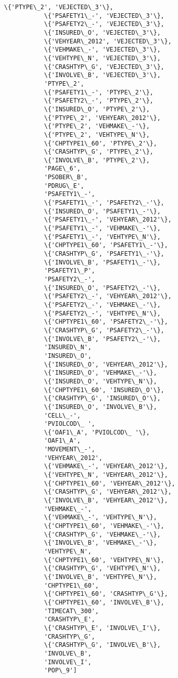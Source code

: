 \documentclass[11pt]{article}
\begin{document}
\begin{Verbatim}[commandchars=\\\{\}]
           \{'PTYPE\_2', 'VEJECTED\_3'\},
           \{'PSAFETY1\_-', 'VEJECTED\_3'\},
           \{'PSAFETY2\_-', 'VEJECTED\_3'\},
           \{'INSURED\_O', 'VEJECTED\_3'\},
           \{'VEHYEAR\_2012', 'VEJECTED\_3'\},
           \{'VEHMAKE\_-', 'VEJECTED\_3'\},
           \{'VEHTYPE\_N', 'VEJECTED\_3'\},
           \{'CRASHTYP\_G', 'VEJECTED\_3'\},
           \{'INVOLVE\_B', 'VEJECTED\_3'\},
           'PTYPE\_2',
           \{'PSAFETY1\_-', 'PTYPE\_2'\},
           \{'PSAFETY2\_-', 'PTYPE\_2'\},
           \{'INSURED\_O', 'PTYPE\_2'\},
           \{'PTYPE\_2', 'VEHYEAR\_2012'\},
           \{'PTYPE\_2', 'VEHMAKE\_-'\},
           \{'PTYPE\_2', 'VEHTYPE\_N'\},
           \{'CHPTYPE1\_60', 'PTYPE\_2'\},
           \{'CRASHTYP\_G', 'PTYPE\_2'\},
           \{'INVOLVE\_B', 'PTYPE\_2'\},
           'PAGE\_6',
           'PSOBER\_B',
           'PDRUG\_E',
           'PSAFETY1\_-',
           \{'PSAFETY1\_-', 'PSAFETY2\_-'\},
           \{'INSURED\_O', 'PSAFETY1\_-'\},
           \{'PSAFETY1\_-', 'VEHYEAR\_2012'\},
           \{'PSAFETY1\_-', 'VEHMAKE\_-'\},
           \{'PSAFETY1\_-', 'VEHTYPE\_N'\},
           \{'CHPTYPE1\_60', 'PSAFETY1\_-'\},
           \{'CRASHTYP\_G', 'PSAFETY1\_-'\},
           \{'INVOLVE\_B', 'PSAFETY1\_-'\},
           'PSAFETY1\_P',
           'PSAFETY2\_-',
           \{'INSURED\_O', 'PSAFETY2\_-'\},
           \{'PSAFETY2\_-', 'VEHYEAR\_2012'\},
           \{'PSAFETY2\_-', 'VEHMAKE\_-'\},
           \{'PSAFETY2\_-', 'VEHTYPE\_N'\},
           \{'CHPTYPE1\_60', 'PSAFETY2\_-'\},
           \{'CRASHTYP\_G', 'PSAFETY2\_-'\},
           \{'INVOLVE\_B', 'PSAFETY2\_-'\},
           'INSURED\_N',
           'INSURED\_O',
           \{'INSURED\_O', 'VEHYEAR\_2012'\},
           \{'INSURED\_O', 'VEHMAKE\_-'\},
           \{'INSURED\_O', 'VEHTYPE\_N'\},
           \{'CHPTYPE1\_60', 'INSURED\_O'\},
           \{'CRASHTYP\_G', 'INSURED\_O'\},
           \{'INSURED\_O', 'INVOLVE\_B'\},
           'CELL\_-',
           'PVIOLCOD\_ ',
           \{'OAF1\_A', 'PVIOLCOD\_ '\},
           'OAF1\_A',
           'MOVEMENT\_-',
           'VEHYEAR\_2012',
           \{'VEHMAKE\_-', 'VEHYEAR\_2012'\},
           \{'VEHTYPE\_N', 'VEHYEAR\_2012'\},
           \{'CHPTYPE1\_60', 'VEHYEAR\_2012'\},
           \{'CRASHTYP\_G', 'VEHYEAR\_2012'\},
           \{'INVOLVE\_B', 'VEHYEAR\_2012'\},
           'VEHMAKE\_-',
           \{'VEHMAKE\_-', 'VEHTYPE\_N'\},
           \{'CHPTYPE1\_60', 'VEHMAKE\_-'\},
           \{'CRASHTYP\_G', 'VEHMAKE\_-'\},
           \{'INVOLVE\_B', 'VEHMAKE\_-'\},
           'VEHTYPE\_N',
           \{'CHPTYPE1\_60', 'VEHTYPE\_N'\},
           \{'CRASHTYP\_G', 'VEHTYPE\_N'\},
           \{'INVOLVE\_B', 'VEHTYPE\_N'\},
           'CHPTYPE1\_60',
           \{'CHPTYPE1\_60', 'CRASHTYP\_G'\},
           \{'CHPTYPE1\_60', 'INVOLVE\_B'\},
           'TIMECAT\_300',
           'CRASHTYP\_E',
           \{'CRASHTYP\_E', 'INVOLVE\_I'\},
           'CRASHTYP\_G',
           \{'CRASHTYP\_G', 'INVOLVE\_B'\},
           'INVOLVE\_B',
           'INVOLVE\_I',
           'POP\_9']
\end{Verbatim}
            
\end{document}
